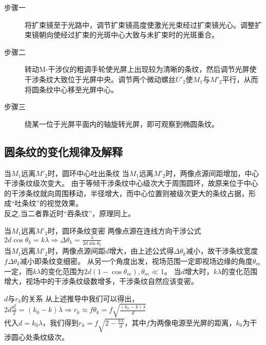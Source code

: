 \documentclass[12pt, a4paper]{ctexart}
\begin{document}
\begin{description}
    \item[步骤一] 将扩束镜至于光路中，调节扩束镜高度使激光光束经过扩束镜光心。调整扩束镜朝向使经过扩束的光斑中心大致与未扩束时的光斑重合。
    \item[步骤二] 转动M-干涉仪的粗调手轮使光屏上出现较为清晰的条纹，然后调节光屏使干涉条纹大致位于光屏中央。调节两个微动螺丝$U'_2$使$M_1$与$M'_2$平行，从而将圆条纹中心移至光屏中心。
    \item[步骤三] 绕某一位于光屏平面内的轴旋转光屏，即可观察到椭圆条纹。
\end{description}

\subsection{圆条纹的变化规律及解释}

\begin{tcolorbox}
    当$M_1$远离$M'_2$时，圆环中心吐出条纹
    \tcblower
    当$M_1$远离$M'_2$时，两像点源间距增加，中心干涉条纹级次变大。
    由于等倾干涉条纹中心级次大于周围圆环，故原来位于中心的干涉条纹就向周围移动，半径增大，而中心位置则被级次更大的条纹占据，形成“吐条纹”的视觉效果。\\
    反之,当二者靠近时“吞条纹”，原理同上。
\end{tcolorbox}

\begin{tcolorbox}
    当$M_1$远离$M'_2$时，圆环条纹变密
    \tcblower
    两像点源在连线方向干涉公式$2d \cos \theta_k = k \lambda \Rightarrow \Delta \theta_k = \frac{\lambda}{2d \sin \theta_k}$\\
    当$M_1$远离$M'_2$时，两像点源间距$d$增大，由上述公式得$\Delta \theta_k$减小，故干涉条纹宽度$f \Delta \theta_k$减小即条纹变细密。
    从另一个角度出发，视场范围一定即视场边缘的角度$\theta_m$一定，而$k \lambda$的变化范围为$2d (1 - \cos \theta_m),\theta_m \ll 1$。
    当$d$增大时，$k \lambda$的变化范围增大，视场中的干涉条纹级数增多，干涉条纹自然应该变密。
\end{tcolorbox}

\begin{tcolorbox}
    $d$与$r_k$的关系
    \tcblower
    从上述推导中我们可以得出，$2d \frac{\theta_k^2}{2} = (k_0 - k)\lambda \Rightarrow r_k \approx f \theta_k = f \sqrt{\frac{(k_0 - k) \lambda}{d}}$\\
    代入$d = k_0 \lambda$，我们得到$r_k = f \sqrt{2 - \frac{k \lambda}{d}}$，其中$f$为两像电源至光屏的距离，$k_0$为干涉圆心处条纹级次。
\end{tcolorbox}
\end{document}
